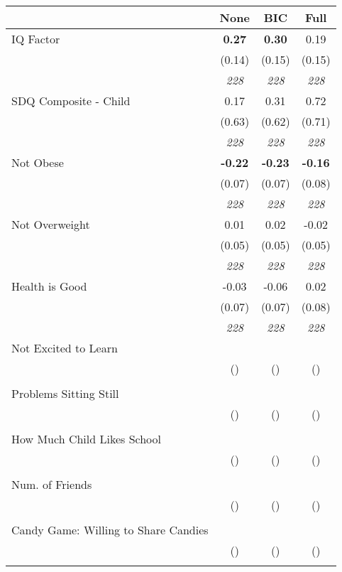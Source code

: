 \begin{tabular}{l c c c}
\toprule
 & None & BIC & Full \\
\midrule
IQ Factor & \textbf{ 0.27 } & \textbf{ 0.30 } & 0.19 \\
& (0.14) & (0.15) & (0.15) \\
& \textit{ 228 } & \textit{ 228 } & \textit{ 228 } \\
SDQ Composite - Child & 0.17 & 0.31 & 0.72 \\
& (0.63) & (0.62) & (0.71) \\
& \textit{ 228 } & \textit{ 228 } & \textit{ 228 } \\
Not Obese & \textbf{ -0.22 } & \textbf{ -0.23 } & \textbf{ -0.16 } \\
& (0.07) & (0.07) & (0.08) \\
& \textit{ 228 } & \textit{ 228 } & \textit{ 228 } \\
Not Overweight & 0.01 & 0.02 & -0.02 \\
& (0.05) & (0.05) & (0.05) \\
& \textit{ 228 } & \textit{ 228 } & \textit{ 228 } \\
Health is Good & -0.03 & -0.06 & 0.02 \\
& (0.07) & (0.07) & (0.08) \\
& \textit{ 228 } & \textit{ 228 } & \textit{ 228 } \\
Not Excited to Learn & & & \\
& () & () & () \\
& & & \\
Problems Sitting Still & & & \\
& () & () & () \\
& & & \\
How Much Child Likes School & & & \\
& () & () & () \\
& & & \\
Num. of Friends & & & \\
& () & () & () \\
& & & \\
Candy Game: Willing to Share Candies & & & \\
& () & () & () \\
& & & \\
\bottomrule
\end{tabular}
